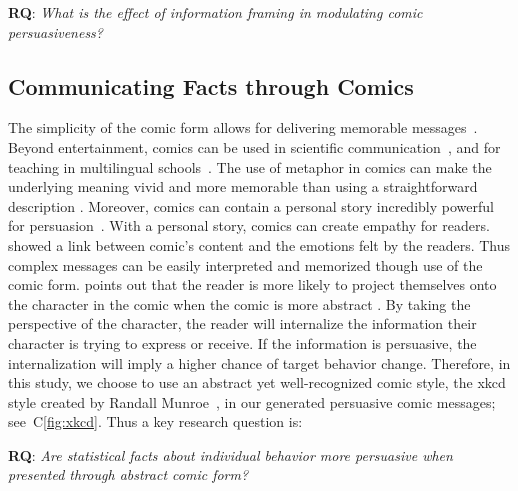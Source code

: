 \textbf{RQ}: \textit{What is the effect of information framing in modulating comic persuasiveness?}

\subsection{Communicating Facts through Comics}
The simplicity of the comic form allows for delivering memorable messages~\cite{scott1993understanding}. Beyond entertainment, comics can be used in scientific communication~\cite{McDermottPB18}, and for teaching in multilingual schools~\cite{cary2004going}.
The use of metaphor in comics can make the underlying meaning vivid and more memorable than using a straightforward description \cite{McDermottPB18,scott1993understanding}. Moreover, comics can contain a personal story incredibly powerful for persuasion~\cite{weaver2017losing}. With a personal story, comics can create empathy for readers.~\textcite{matsubara2016emotional} showed a link between comic's content and the emotions felt by the readers. Thus complex messages can be easily interpreted and memorized though use of the comic form. \textcite{scott1993understanding} points out that the reader is more likely to project themselves onto the character in the comic when the comic is more abstract \cite{scott1993understanding}. By taking the perspective of the character, the reader will internalize the information their character is trying to express or receive. If the information is persuasive, the internalization will imply a higher chance of target behavior change. Therefore, in this study, we choose to use an abstract yet well-recognized comic style, the xkcd style created by Randall Munroe~\cite{munroe2009xkcd}, in our generated persuasive comic messages; see~C\ref{fig:xkcd}. Thus a key research question is:

\textbf{RQ}: \textit{Are statistical facts about individual behavior more persuasive when presented through abstract comic form?}


